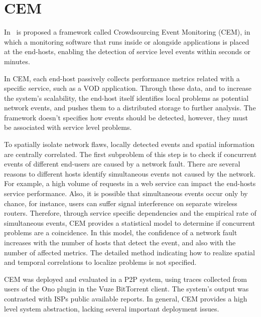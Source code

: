 \section{CEM}

In~\cite{crowdsourcing_service_level_network_event_monitoring} is proposed a
framework called Crowdsourcing Event Monitoring (CEM), in which a
monitoring software that runs inside or alongside applications is placed at the
end-hosts, enabling the detection of service level events within seconds or
minutes.

In CEM, each end-host passively collects performance metrics related with a
specific service, such as a VOD application.
Through these data, and to increase the system's scalability,
the end-host itself identifies local problems as
potential network events, and pushes them to a distributed storage to further
analysis.
The framework doesn't specifies how events should be detected,
however, they must be associated with service level problems.

To spatially isolate network flaws, locally detected events and spatial
information are centrally correlated.
The first subproblem of this step is to check if concurrent events
of different end-users are caused by a
network fault. There are several reasons to different hosts identify
simultaneous events not caused by the network.
For example, a high volume of requests in a web service can impact the end-hosts
service performance. Also, it is
possible that simultaneous events occur only by chance, for instance, users
can suffer signal interference on separate wireless routers.
Therefore, through service specific dependencies and the empirical rate of
simultaneous
events, CEM provides a statistical model to determine if
concurrent problems are a coincidence.
In this model, the confidence of a network fault increases with the
number of hosts that detect the event, and also with the number of affected
metrics.
The detailed method indicating how to realize spatial and temporal
correlations to
localize problems is not specified.

CEM was deployed and evaluated in a P2P system, using traces
collected
from users of the Ono plugin in the Vuze BitTorrent client. The system's
output was contrasted with ISPs public available reports. In general,
CEM provides a high level system abstraction, lacking several
important deployment issues.
